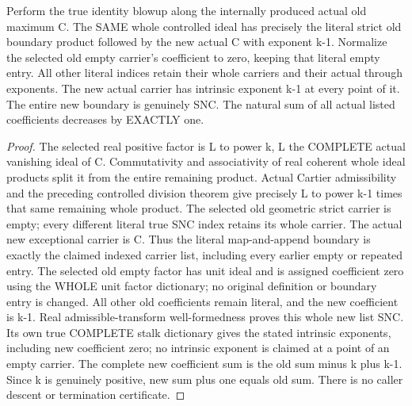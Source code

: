 \begin{theorem}
\label{hir:nc-ordered-tail-actual-cartier-coefficient-drop}
\leanok
Perform the true identity blowup along the internally produced actual old
maximum C. The SAME whole controlled ideal has precisely the literal strict
old boundary product followed by the new actual C with exponent k-1.
Normalize the selected old empty carrier's coefficient to zero, keeping that
literal empty entry. All other literal indices retain their whole carriers
and their actual through exponents. The new actual carrier has intrinsic
exponent k-1 at every point of it. The entire new boundary is genuinely SNC.
The natural sum of all actual listed coefficients decreases by EXACTLY one.
\end{theorem}
\begin{proof}
The selected real positive factor is L to power k, L the COMPLETE actual
vanishing ideal of C. Commutativity and associativity of real coherent whole
ideal products split it from the entire remaining product. Actual Cartier
admissibility and the preceding controlled division theorem give precisely
L to power k-1 times that same remaining whole product. The selected old
geometric strict carrier is empty; every different literal true SNC index
retains its whole carrier. The actual new exceptional carrier is C. Thus the
literal map-and-append boundary is exactly the claimed indexed carrier list,
including every earlier empty or repeated entry. The selected old empty
factor has unit ideal and is assigned coefficient zero using the WHOLE unit
factor dictionary; no original definition or boundary entry is changed.
All other old coefficients remain literal, and the new coefficient is k-1.
Real admissible-transform well-formedness proves this whole new list SNC.
Its own true COMPLETE stalk dictionary gives the stated intrinsic exponents,
including new coefficient zero; no intrinsic exponent is claimed at a point
of an empty carrier. The complete new coefficient sum is the old sum minus
k plus k-1. Since k is genuinely positive, new sum plus one equals old sum.
There is no caller descent or termination certificate.
\end{proof}

